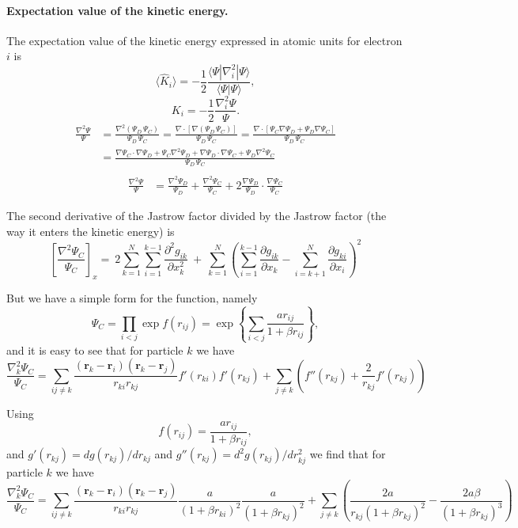\documentclass[%
oneside,                 %
final,                   %
10pt]{article}
\begin{document}
\paragraph{Expectation value of the kinetic energy.}
The expectation value of the kinetic energy expressed in atomic units for electron $i$ is 
\[
 \langle \hat{K}_i \rangle = -\frac{1}{2}\frac{\langle\Psi|\nabla_{i}^2|\Psi \rangle}{\langle\Psi|\Psi \rangle},
\]
\begin{equation}
\label{kineticE}
K_i = -\frac{1}{2}\frac{\nabla_{i}^{2} \Psi}{\Psi}.
\end{equation}
\begin{align}
\frac{\nabla^2 \Psi}{\Psi} & =  \frac{\nabla^2 ({\Psi_{D} \,  \Psi_C})}{\Psi_{D} \,  \Psi_C} = \frac{\nabla  \cdot [\nabla  {(\Psi_{D} \,  \Psi_C)}]}{\Psi_{D} \,  \Psi_C} = \frac{\nabla  \cdot [ \Psi_C \nabla  \Psi_{D} + \Psi_{D} \nabla   \Psi_C]}{\Psi_{D} \,  \Psi_C}\nonumber\\
&  =  \frac{\nabla   \Psi_C \cdot \nabla  \Psi_{D} +  \Psi_C \nabla^2 \Psi_{D} + \nabla  \Psi_{D} \cdot \nabla   \Psi_C + \Psi_{D} \nabla^2  \Psi_C}{\Psi_{D} \,  \Psi_C}\nonumber\\
\end{align}
\begin{align}
\frac{\nabla^2 \Psi}{\Psi}
& =  \frac{\nabla^2 \Psi_{D}}{\Psi_{D}} + \frac{\nabla^2  \Psi_C}{ \Psi_C} + 2 \frac{\nabla  \Psi_{D}}{\Psi_{D}}\cdot\frac{\nabla   \Psi_C}{ \Psi_C}
\end{align}

The second derivative of the Jastrow factor divided by the Jastrow factor (the way it enters the kinetic energy) is
\[
\left[\frac{\nabla^2 \Psi_C}{\Psi_C}\right]_x =\  
2\sum_{k=1}^{N}
\sum_{i=1}^{k-1}\frac{\partial^2 g_{ik}}{\partial x_k^2}\ +\ 
\sum_{k=1}^N
\left(
\sum_{i=1}^{k-1}\frac{\partial g_{ik}}{\partial x_k} -
\sum_{i=k+1}^{N}\frac{\partial g_{ki}}{\partial x_i}
\right)^2
\]

But we have a simple form for the function, namely
\[
\Psi_{C}=\prod_{i< j}\exp{f(r_{ij})}= \exp{\left\{\sum_{i<j}\frac{ar_{ij}}{1+\beta r_{ij}}\right\}},
\]
and it is easy to see that for particle  $k$
we have
\[
  \frac{\nabla^2_k \Psi_C}{\Psi_C }=
\sum_{ij\ne k}\frac{(\mathbf{r}_k-\mathbf{r}_i)(\mathbf{r}_k-\mathbf{r}_j)}{r_{ki}r_{kj}}f'(r_{ki})f'(r_{kj})+
\sum_{j\ne k}\left( f''(r_{kj})+\frac{2}{r_{kj}}f'(r_{kj})\right)
\]

Using 
\[
f(r_{ij})= \frac{ar_{ij}}{1+\beta r_{ij}},
\]
and $g'(r_{kj})=dg(r_{kj})/dr_{kj}$ and 
$g''(r_{kj})=d^2g(r_{kj})/dr_{kj}^2$  we find that for particle  $k$
we have
\[
  \frac{\nabla^2_k \Psi_C}{\Psi_C }=
\sum_{ij\ne k}\frac{(\mathbf{r}_k-\mathbf{r}_i)(\mathbf{r}_k-\mathbf{r}_j)}{r_{ki}r_{kj}}\frac{a}{(1+\beta r_{ki})^2}
\frac{a}{(1+\beta r_{kj})^2}+
\sum_{j\ne k}\left(\frac{2a}{r_{kj}(1+\beta r_{kj})^2}-\frac{2a\beta}{(1+\beta r_{kj})^3}\right)
\]
\end{document}
